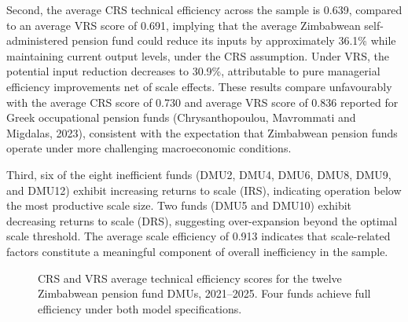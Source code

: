 \documentclass[12pt,a4paper]{article}
\begin{document}
Second, the average CRS technical efficiency across the sample is 0.639, compared to an average VRS score of 0.691, implying that the average Zimbabwean self-administered pension fund could reduce its inputs by approximately 36.1\% while maintaining current output levels, under the CRS assumption. Under VRS, the potential input reduction decreases to 30.9\%, attributable to pure managerial efficiency improvements net of scale effects. These results compare unfavourably with the average CRS score of 0.730 and average VRS score of 0.836 reported for Greek occupational pension funds (Chrysanthopoulou, Mavrommati and Migdalas, 2023), consistent with the expectation that Zimbabwean pension funds operate under more challenging macroeconomic conditions.

Third, six of the eight inefficient funds (DMU2, DMU4, DMU6, DMU8, DMU9, and DMU12) exhibit increasing returns to scale (IRS), indicating operation below the most productive scale size. Two funds (DMU5 and DMU10) exhibit decreasing returns to scale (DRS), suggesting over-expansion beyond the optimal scale threshold. The average scale efficiency of 0.913 indicates that scale-related factors constitute a meaningful component of overall inefficiency in the sample.

\begin{figure}[H]
\centering
{}
\caption{CRS and VRS average technical efficiency scores for the twelve Zimbabwean pension fund DMUs, 2021--2025. Four funds achieve full efficiency under both model specifications.}
\label{fig:crs_vrs_comparison}
\end{figure}
\end{document}
